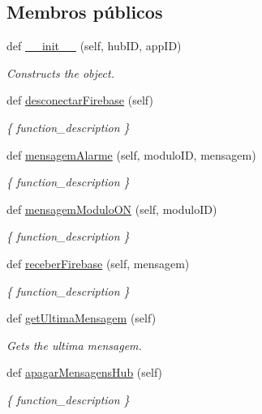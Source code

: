 \subsection*{Membros públicos}
\begin{DoxyCompactItemize}
\item 
def \hyperlink{classhub_para_firebase_1_1_hub_para_firebase_a2c9535c4753cd92950dab73023519e0c}{\+\_\+\+\_\+init\+\_\+\+\_\+} (self, hub\+ID, app\+ID)
\begin{DoxyCompactList}\small\item\em Constructs the object. \end{DoxyCompactList}\item 
def \hyperlink{classhub_para_firebase_1_1_hub_para_firebase_a8867ea8f38db645837f1c0ab0a4b207e}{desconectar\+Firebase} (self)
\begin{DoxyCompactList}\small\item\em \{ function\+\_\+description \} \end{DoxyCompactList}\item 
def \hyperlink{classhub_para_firebase_1_1_hub_para_firebase_aec0b9ed7691e78978716075fe999019a}{mensagem\+Alarme} (self, modulo\+ID, mensagem)
\begin{DoxyCompactList}\small\item\em \{ function\+\_\+description \} \end{DoxyCompactList}\item 
def \hyperlink{classhub_para_firebase_1_1_hub_para_firebase_a269bab1a9f98ad3ef1ac4a0f31a59a57}{mensagem\+Modulo\+ON} (self, modulo\+ID)
\begin{DoxyCompactList}\small\item\em \{ function\+\_\+description \} \end{DoxyCompactList}\item 
def \hyperlink{classhub_para_firebase_1_1_hub_para_firebase_aab4023d0316ce43f1ed743aa6d02064e}{receber\+Firebase} (self, mensagem)
\begin{DoxyCompactList}\small\item\em \{ function\+\_\+description \} \end{DoxyCompactList}\item 
def \hyperlink{classhub_para_firebase_1_1_hub_para_firebase_a8c00d07d181c47e4567b602947466abe}{get\+Ultima\+Mensagem} (self)
\begin{DoxyCompactList}\small\item\em Gets the ultima mensagem. \end{DoxyCompactList}\item 
def \hyperlink{classhub_para_firebase_1_1_hub_para_firebase_a434ba152fb00900dddfaf2f61e5d78b6}{apagar\+Mensagens\+Hub} (self)
\begin{DoxyCompactList}\small\item\em \{ function\+\_\+description \} \end{DoxyCompactList}\end{DoxyCompactItemize}
